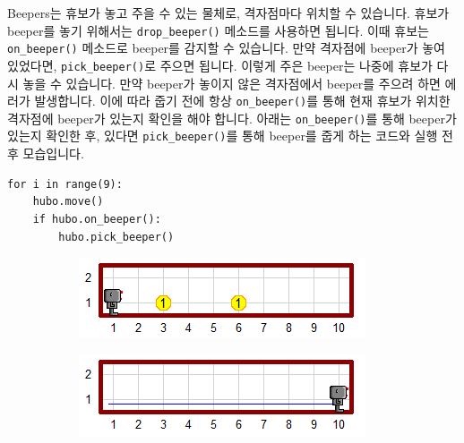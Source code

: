 \documentclass[../main.tex]{subfiles}
\begin{document}
Beepers는 휴보가 놓고 주을 수 있는 물체로, 격자점마다 위치할 수 있습니다.
휴보가 beeper를 놓기 위해서는 \texttt{drop\_beeper()} 메소드를 사용하면 됩니다.
이때 휴보는 \texttt{on\_beeper()} 메소드로 beeper를 감지할 수 있습니다.
만약 격자점에 beeper가 놓여 있었다면, \texttt{pick\_beeper()}로 주으면 됩니다.
이렇게 주은 beeper는 나중에 휴보가 다시 놓을 수 있습니다.
만약 beeper가 놓이지 않은 격자점에서 beeper를 주으려 하면 에러가 발생합니다.
이에 따라 줍기 전에 항상 \texttt{on\_beeper()}를 통해 현재 휴보가 위치한 격자점에 beeper가 있는지 확인을 해야 합니다.
아래는 \texttt{on\_beeper()}를 통해 beeper가 있는지 확인한 후, 있다면 \texttt{pick\_beeper()}를 통해 beeper를 줍게 하는 코드와 실행 전후 모습입니다.
\begin{verbatim}
for i in range(9):
	hubo.move()
	if hubo.on_beeper():
		hubo.pick_beeper()
\end{verbatim}
\begin{figure}[H]
\centering
\begin{subfigure}{.5\textwidth}
\centering
\includegraphics[width=.9\linewidth]{"./lectures/lecture5_pickbeeperbef"}
\label{fig:lecture5pickbeeperbef}
\end{subfigure}%
\begin{subfigure}{.5\textwidth}
\centering
\includegraphics[width=.9\linewidth]{"./lectures/lecture5_pickbeeperaft"}
\label{fig:lecture5pickbeeperaft}
\end{subfigure}
\end{figure}
\end{document}
